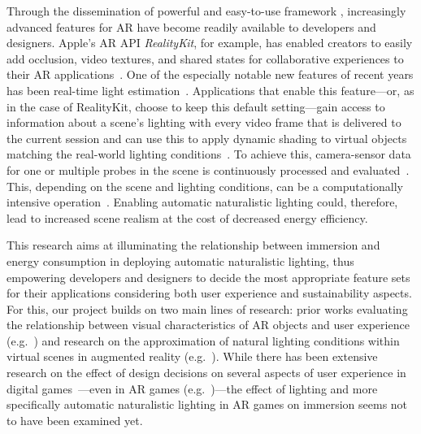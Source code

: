 \documentclass[12pt,twoside,english]{article}
\begin{document}
Through the dissemination of powerful and easy-to-use framework , increasingly advanced features for \gls{AR} have become readily available to developers and designers.
Apple's \gls{AR} \gls{API} \textit{RealityKit}, for example, has enabled creators to easily add occlusion, video textures, and shared states for collaborative experiences to their \gls{AR} applications~\cite{apple_realitykit_2020-1}.
One of the especially notable new features of recent years has been real-time light estimation~\cite{apple_arlightestimate_2020}.
Applications that enable this feature---or, as in the case of RealityKit, choose to keep this default setting---gain access to information about a scene's lighting with every video frame that is delivered to the current session and can use this to apply dynamic shading to virtual objects matching the real-world lighting conditions~\cite{apple_arlightestimate_2020}.
To achieve this, camera-sensor data for one or multiple probes in the scene is continuously processed and evaluated~\cite{apple_arlightestimate_2020,apple_disablearenvironmentlighting_2020}.
This, depending on the scene and lighting conditions, can be a computationally intensive operation~\cite{steed_constructing_2016}.
Enabling automatic naturalistic lighting could, therefore, lead to increased scene realism at the cost of decreased energy efficiency.

This research aims at illuminating the relationship between immersion and energy consumption in deploying automatic naturalistic lighting, thus empowering developers and designers to decide the most appropriate feature sets for their applications considering both user experience and sustainability aspects.
For this, our project builds on two main lines of research: prior works evaluating the relationship between visual characteristics of \gls{AR} objects and user experience (e.g.~\cite{gabbard_effects_2006}) and research on the approximation of natural lighting conditions within virtual scenes in augmented reality (e.g.~\cite{aittala_inverse_2010}).
While there has been extensive research on the effect of design decisions on several aspects of user experience in digital games~\cite{johnson_validation_2018}---even in \gls{AR} games (e.g.~\cite{georgiou_development_2017})---the effect of lighting and more specifically automatic naturalistic lighting in \gls{AR} games on immersion seems not to have been examined yet.
\end{document}
